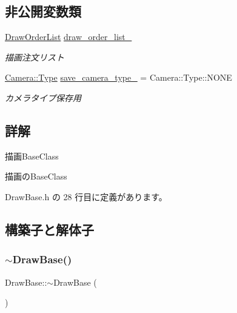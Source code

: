 \subsection*{非公開変数類}
\begin{DoxyCompactItemize}
\item 
\mbox{\hyperlink{class_draw_order_list}{Draw\+Order\+List}} \mbox{\hyperlink{class_draw_base_a6ebc8dc96176ddd3bd984b3d54739adb}{draw\+\_\+order\+\_\+list\+\_\+}}
\begin{DoxyCompactList}\small\item\em 描画注文リスト \end{DoxyCompactList}\item 
\mbox{\hyperlink{class_camera_a3b0a1f58deca679ac665f61c480d1dcb}{Camera\+::\+Type}} \mbox{\hyperlink{class_draw_base_aa8be4980756a0af7cc76dfe455c492d4}{save\+\_\+camera\+\_\+type\+\_\+}} = Camera\+::\+Type\+::\+N\+O\+NE
\begin{DoxyCompactList}\small\item\em カメラタイプ保存用 \end{DoxyCompactList}\end{DoxyCompactItemize}


\subsection{詳解}
描画\+Base\+Class 

描画の\+Base\+Class 

 Draw\+Base.\+h の 28 行目に定義があります。



\subsection{構築子と解体子}
\mbox{\label{class_draw_base_af276fa23e7c5f51a4fdeab016456a992}} 
\subsubsection{\texorpdfstring{$\sim$\+Draw\+Base()}{~DrawBase()}}
{\footnotesize\ttfamily Draw\+Base\+::$\sim$\+Draw\+Base (\begin{DoxyParamCaption}{ }\end{DoxyParamCaption})\hspace{0.3cm}{\ttfamily [pure virtual]}}



